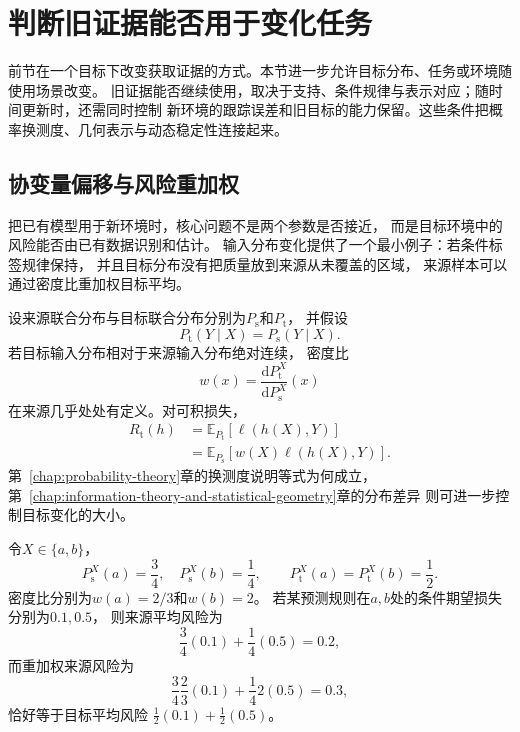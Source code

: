 \section{判断旧证据能否用于变化任务}
\label{sec:future-knowledge-evolution-transfer}

前节在一个目标下改变获取证据的方式。本节进一步允许目标分布、任务或环境随使用场景改变。
旧证据能否继续使用，取决于支持、条件规律与表示对应；随时间更新时，还需同时控制
新环境的跟踪误差和旧目标的能力保留。这些条件把概率换测度、几何表示与动态稳定性连接起来。

\subsection{协变量偏移与风险重加权}
\label{sec:future-input-shift-risk-reweighting}

把已有模型用于新环境时，核心问题不是两个参数是否接近，
而是目标环境中的风险能否由已有数据识别和估计。
输入分布变化提供了一个最小例子：若条件标签规律保持，
并且目标分布没有把质量放到来源从未覆盖的区域，
来源样本可以通过密度比重加权目标平均。

设来源联合分布与目标联合分布分别为$P_{\mathrm s}$和$P_{\mathrm t}$，
并假设
\[
  P_{\mathrm t}(Y\mid X)
  =
  P_{\mathrm s}(Y\mid X).
\]
若目标输入分布相对于来源输入分布绝对连续，
密度比
\[
  w(x)
  =
  \frac{\mathrm dP_{\mathrm t}^{X}}
  {\mathrm dP_{\mathrm s}^{X}}(x)
\]
在来源几乎处处有定义。对可积损失，
\begin{align}
  R_{\mathrm t}(h)
  &=
  \mathbb{E}_{P_{\mathrm t}}
  [\ell(h(X),Y)]
  \nonumber\\
  &=
  \mathbb{E}_{P_{\mathrm s}}
  \left[
    w(X)\ell(h(X),Y)
  \right].
  \label{eq:future-covariate-shift}
\end{align}
第~\ref{chap:probability-theory}章的换测度说明等式为何成立，
第~\ref{chap:information-theory-and-statistical-geometry}章的分布差异
则可进一步控制目标变化的大小。

\begin{example}[两点空间上的重加权]
  \label{ex:future-two-point-reweighting}
  令$X\in\{a,b\}$，
  \[
    P_{\mathrm s}^{X}(a)=\frac{3}{4},
    \quad
    P_{\mathrm s}^{X}(b)=\frac{1}{4},
    \qquad
    P_{\mathrm t}^{X}(a)
    =
    P_{\mathrm t}^{X}(b)
    =
    \frac{1}{2}.
  \]
  密度比分别为$w(a)=2/3$和$w(b)=2$。
  若某预测规则在$a,b$处的条件期望损失分别为$0.1,0.5$，
  则来源平均风险为
  \[
    \frac{3}{4}(0.1)+\frac{1}{4}(0.5)=0.2,
  \]
  而重加权来源风险为
  \[
    \frac{3}{4}\frac{2}{3}(0.1)
    +
    \frac{1}{4}2(0.5)
    =
    0.3,
  \]
  恰好等于目标平均风险
  $\frac12(0.1)+\frac12(0.5)$。
\end{example}

